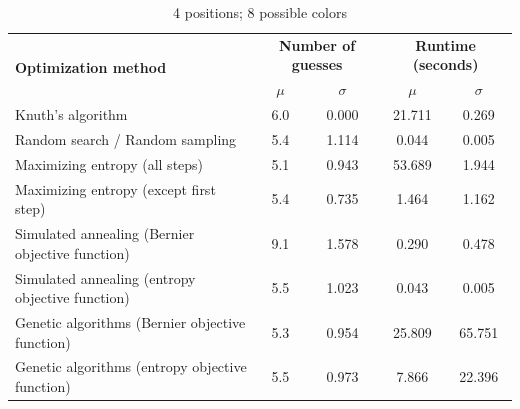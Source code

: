 \documentclass[11pt]{article}
\begin{document}
\begin{table}[h!]
\begin{center}
\begin{tabular}{l c c c c}
\toprule
\multirow{2}{*}{\bfseries Optimization method} 		& \multicolumn{2}{c}{\bfseries Number of guesses} 		& \multicolumn{2}{c}{\bfseries Runtime (seconds)}	\\
\cmidrule(lr){2-3}  \cmidrule(lr){4-5}				& $\mu$ & $\sigma$								& $\mu$ & $\sigma$							\\
\cmidrule(lr){1-5}
Knuth's algorithm							& 6.0 & 0.000									& 21.711 & 0.269							\\
Random search / Random sampling				& 5.4 & 1.114									& 0.044 & 0.005							\\
Maximizing entropy (all steps)					& 5.1 & 0.943									& 53.689 & 1.944							\\
Maximizing entropy (except first step)			& 5.4 & 0.735									& 1.464 & 1.162							\\
Simulated annealing (Bernier objective function)	& 9.1 & 1.578									& 0.290 & 0.478							\\
Simulated annealing (entropy objective function)	& 5.5 & 1.023									& 0.043 & 0.005							\\
Genetic algorithms (Bernier objective function)		& 5.3 & 0.954									& 25.809 & 65.751							\\
Genetic algorithms (entropy objective function)		& 5.5 & 0.973									& 7.866 & 22.396							\\
\bottomrule
\end{tabular}
\end{center}
\caption{4 positions; 8 possible colors}
\label{fig:compare_4_8}
\end{table}
\end{document}
